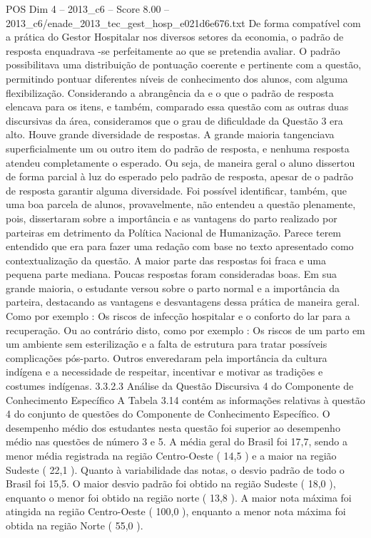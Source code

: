 \begin{textsample}{POS Dim 4 – 2013\_c6 – Score 8.00 – 2013\_c6/enade\_2013\_tec\_gest\_hosp\_e021d6e676.txt}
De forma compatível com a prática do Gestor Hospitalar nos diversos setores da economia, o padrão de resposta enquadrava -se perfeitamente ao que se pretendia avaliar.
O padrão possibilitava uma distribuição de pontuação coerente e pertinente com a questão, permitindo pontuar diferentes níveis de conhecimento dos alunos, com alguma flexibilização.
Considerando a abrangência da e o que o padrão de resposta elencava para os itens, e também, comparado essa questão com as outras duas discursivas da área, consideramos que o grau de dificuldade da Questão 3 era alto.
Houve grande diversidade de respostas.
A grande maioria tangenciava superficialmente um ou outro item do padrão de resposta, e nenhuma resposta atendeu completamente o esperado.
Ou seja, de maneira geral o aluno dissertou de forma parcial à luz do esperado pelo padrão de resposta, apesar de o padrão de resposta garantir alguma diversidade.
Foi possível identificar, também, que uma boa parcela de alunos, provavelmente, não entendeu a questão plenamente, pois, dissertaram sobre a importância e as vantagens do parto realizado por parteiras em detrimento da Política Nacional de Humanização.
Parece terem entendido que era para fazer uma redação com base no texto apresentado como contextualização da questão.
A maior parte das respostas foi fraca e uma pequena parte mediana.
Poucas respostas foram consideradas boas.
Em sua grande maioria, o estudante versou sobre o parto normal e a importância da parteira, destacando as vantagens e desvantagens dessa prática de maneira geral.
Como por exemplo : Os riscos de infecção hospitalar e o conforto do lar para a recuperação.
Ou ao contrário disto, como por exemplo : Os riscos de um parto em um ambiente sem esterilização e a falta de estrutura para tratar possíveis complicações pós-parto.
Outros enveredaram pela importância da cultura indígena e a necessidade de respeitar, incentivar e motivar as tradições e costumes indígenas. 3.3.2.3 Análise da Questão Discursiva 4 do Componente de Conhecimento Específico A Tabela 3.14 contém as informações relativas à questão 4 do conjunto de questões do Componente de Conhecimento Específico.
O desempenho médio dos estudantes nesta questão foi superior ao desempenho médio nas questões de número 3 e 5.
A média geral do Brasil foi 17,7, sendo a menor média registrada na região Centro-Oeste ( 14,5 ) e a maior na região Sudeste ( 22,1 ).
Quanto à variabilidade das notas, o desvio padrão de todo o Brasil foi 15,5.
O maior desvio padrão foi obtido na região Sudeste ( 18,0 ), enquanto o menor foi obtido na região norte ( 13,8 ).
A maior nota máxima foi atingida na região Centro-Oeste ( 100,0 ), enquanto a menor nota máxima foi obtida na região Norte ( 55,0 ).

\end{textsample}
